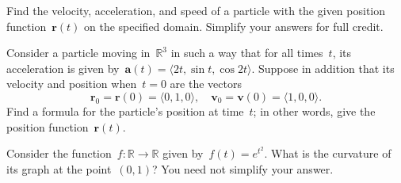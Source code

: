 \documentclass[11pt]{exam}
\newcommand{\R}{\mathbb{R}}
\newcommand{\dwrspace}[1]{\vspace*{\stretch{#1}}}
\renewcommand{\vec}[1]{\mathbf{#1}}
\begin{document}
\begin{questions}

\question[20] Find the velocity, acceleration, and speed of a particle with the given position function~$\vec{r}(t)$ on the specified domain. Simplify your answers for full credit.


\question[10] Consider a particle moving in~$\R^3$ in such a way that for all times~$t$, its acceleration is given by~$\vec{a}(t) = \langle 2t, \sin t, \cos 2t \rangle$. Suppose in addition that its velocity and position when~$t = 0$ are the vectors
\[
    \vec{r}_0 = \vec{r}(0) = \langle 0, 1, 0 \rangle, \quad 
    \vec{v}_0 = \vec{v}(0) = \langle 1, 0, 0 \rangle.
\]
Find a formula for the particle's position at time~$t$; in other words, give the position function~$\vec{r}(t)$.

\dwrspace{2}

\newpage

\question[8] Consider the function~$f \colon \R \to \R$ given by~$f(t) = e^{t^2}$. What is the curvature of its graph at the point~$(0,1)$? You need not simplify your answer.

\dwrspace{3}

\question

\end{questions}
\end{document}
